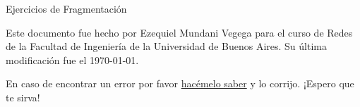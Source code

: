 \begin{center}
    \huge Ejercicios de Fragmentación
\end{center}

Este documento fue hecho por Ezequiel Mundani Vegega para el curso de Redes de la Facultad de Ingeniería de la Universidad de Buenos Aires. Su última modificación fue el \today.

\skipline
En caso de encontrar un error por favor {\color{blue}\href{mailto:emundani@fi.uba.ar}{hacémelo saber}} y lo corrijo. ¡Espero que te sirva!
